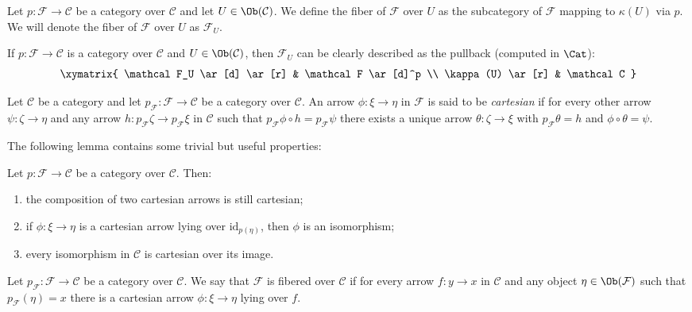\begin{defin}
Let $p \colon \mathcal F \to \mathcal C$ be a category over $\mathcal C$ and let $U \in \Ob(\mathcal C)$. We define the fiber of $\mathcal F$ over $U$ as the subcategory of $\mathcal F$ mapping to $\kappa(U)$ via $p$. We will denote the fiber of $\mathcal F$ over $U$ as $\mathcal F_U$.
\end{defin}

\begin{rmk}
If $p \colon \mathcal F \to \mathcal C$ is a category over $\mathcal C$ and $U \in \Ob(\mathcal C)$, then $\mathcal F_U$ can be clearly described as the pullback (computed in $\Cat$):
\[
\xymatrix{
\mathcal F_U \ar[d] \ar[r] & \mathcal F \ar[d]^p \\ \kappa(U) \ar[r] & \mathcal C
}
\]
\end{rmk}

\begin{defin}
Let $\mathcal C$ be a category and let $p_\mathcal{F} \colon \mathcal F \to \mathcal C$ be a category over $\mathcal C$. An arrow $\phi \colon \xi \to \eta$ in $\mathcal F$ is said to be \emph{cartesian} if for every other arrow $\psi \colon \zeta \to \eta$ and any arrow $h \colon p_\mathcal{F} \zeta \to p_{\mathcal F} \xi$ in $\mathcal C$ such that $p_{\mathcal F} \phi \circ h = p_{\mathcal F} \psi$ there exists a unique arrow $\theta \colon \zeta \to \xi$ with $p_{\mathcal F} \theta = h$ and $\phi \circ \theta = \psi$.
\end{defin}

The following lemma contains some trivial but useful properties:

\begin{lemma} \label{lemma cartesian arrows}
Let $p \colon \mathcal F \to \mathcal C$ be a category over $\mathcal C$. Then:
\begin{enumerate}
\item the composition of two cartesian arrows is still cartesian;
\item if $\phi \colon \xi \to \eta$ is a cartesian arrow lying over $\mathrm{id}_{p(\eta)}$, then $\phi$ is an isomorphism;
\item every isomorphism in $\mathcal C$ is cartesian over its image.
\end{enumerate}
\end{lemma}

\begin{defin}
Let $p_{\mathcal F} \colon \mathcal F \to \mathcal C$ be a category over $\mathcal C$. We say that $\mathcal F$ is fibered over $\mathcal C$ if for every arrow $f \colon y \to x$ in $\mathcal C$ and any object $\eta \in \Ob(\mathcal F)$ such that $p_{\mathcal F}(\eta) = x$ there is a cartesian arrow $\phi \colon \xi \to \eta$ lying over $f$.
\end{defin}

